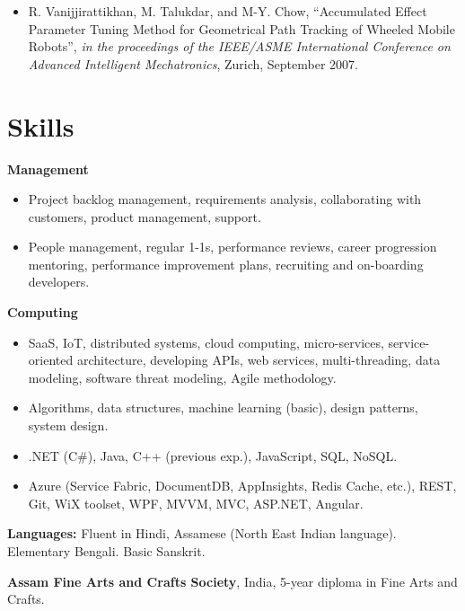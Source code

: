 \documentclass[letterpaper,10pt]{article}
\newcommand{\resumeItemListStart}{\begin{itemize}}
\newcommand{\resumeItemListEnd}{\end{itemize}}
\newcommand{\resumeListItem}[1]{
	\item{#1 \vspace{-6pt}}
}
\begin{document}
	\resumeItemListStart
	\resumeListItem {R. Vanijjirattikhan, M. Talukdar, and M-Y. Chow, ``Accumulated Effect Parameter Tuning Method for Geometrical Path Tracking of Wheeled Mobile Robots'', \textit{in the proceedings of the IEEE/ASME International Conference on Advanced Intelligent Mechatronics}, Zurich, September 2007.}
	\resumeItemListEnd

	\section{Skills}

	\textbf{Management}\vspace{-8pt}
	\resumeItemListStart
	\resumeListItem{Project backlog management, requirements analysis, collaborating with customers, product management, support.}
	\resumeListItem {People management, regular 1-1s, performance reviews, career progression mentoring, performance improvement plans, recruiting and on-boarding developers.}
	\resumeItemListEnd

	\textbf{Computing}\vspace{-8pt}
	\resumeItemListStart
	\resumeListItem {SaaS, IoT, distributed systems, cloud computing, micro-services, service-oriented architecture, developing APIs, web services, multi-threading, data modeling, software threat modeling, Agile methodology.}
	\resumeListItem {Algorithms, data structures, machine learning (basic), design patterns, system design.}
	\resumeListItem {.NET (C\#), Java, C++ (previous exp.), JavaScript, SQL, NoSQL.}
	\resumeListItem {Azure (Service Fabric, DocumentDB, AppInsights, Redis Cache, etc.), REST, Git, WiX toolset, WPF, MVVM, MVC, ASP.NET, Angular.}
	\resumeItemListEnd

	\textbf{Languages:} Fluent in Hindi, Assamese (North East Indian language). Elementary Bengali. Basic Sanskrit.

	\textbf{Assam Fine Arts and Crafts Society}, India, 5-year diploma in Fine Arts and Crafts.

\end{document}
